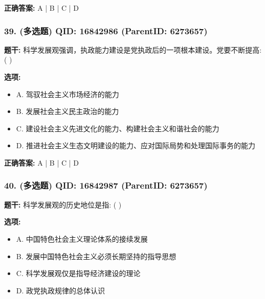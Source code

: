 \documentclass[12pt,UTF8]{ctexart}
\begin{document}
\textbf{正确答案:}
A | B | C | D

\vspace{0.3em}\hrulefill\vspace{0.7em}

\subsubsection*{39. (多选题) \small QID: 16842986 (ParentID: 6273657)}

\textbf{题干:}
科学发展观强调，执政能力建设是党执政后的一项根本建设。党要不断提高: ( )



\textbf{选项:}
\begin{itemize}[leftmargin=*]

  \item A. 驾驭社会主义市场经济的能力

  \item B. 发展社会主义民主政治的能力

  \item C. 建设社会主义先进文化的能力、构建社会主义和谐社会的能力

  \item D. 推进社会主义生态文明建设的能力、应对国际局势和处理国际事务的能力

\end{itemize}

\textbf{正确答案:}
A | B | C | D

\vspace{0.3em}\hrulefill\vspace{0.7em}

\subsubsection*{40. (多选题) \small QID: 16842987 (ParentID: 6273657)}

\textbf{题干:}
科学发展观的历史地位是指: ( )



\textbf{选项:}
\begin{itemize}[leftmargin=*]

  \item A. 中国特色社会主义理论体系的接续发展

  \item B. 发展中国特色社会主义必须长期坚持的指导思想

  \item C. 科学发展观仅是指导经济建设的理论

  \item D. 政党执政规律的总体认识

\end{itemize}
\end{document}
